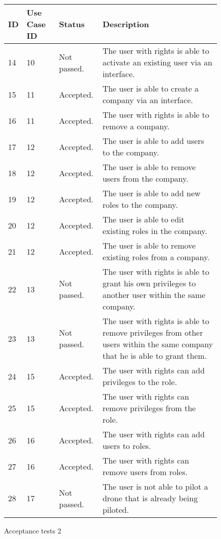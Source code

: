\begin{figure}[htb]
\begin{center}
\begin{tabular}{ | l | l | l | p{8cm} | }
  \hline
	\textbf{ID} & \textbf{Use Case ID} & \textbf{Status} & \textbf{Description} \\ \hline
	14 & 10 & Not passed. & The user with rights is able to activate an existing user via an interface.  \\ \hline
	15 & 11 & Accepted. & The user is able to create a company via an interface.  \\ \hline
	16 & 11 & Accepted. & The user with rights is able to remove a company. \\ \hline
	17 & 12 & Accepted. & The user is able to add users to the company.   \\ \hline
	18 & 12 & Accepted. & The user is able to remove users from the company.  \\ \hline
	19 & 12 & Accepted. & The user is able to add new roles to the company.  \\ \hline
	20 & 12 & Accepted. & The user is able to edit existing roles in the company.  \\ \hline
	21 & 12 & Accepted. & The user is able to remove existing roles from a company.  \\ \hline
	22 & 13 & Not passed. & The user with rights is able to grant his own privileges to another user within the same company.  \\ \hline
	23 & 13 & Not passed. & The user with rights is able to remove privileges from other users within the same company that he is able to grant them.  \\ \hline
	24 & 15 & Accepted. & The user with rights can add privileges to the role.  \\ \hline
	25 & 15 & Accepted. & The user with rights can remove privileges from the role.  \\ \hline
	26 & 16 & Accepted. & The user with rights can add users to roles.  \\ \hline
	27 & 16 & Accepted. & The user with rights can remove users from roles.  \\ \hline
	28 & 17 & Not passed. & The user is not able to pilot a drone that is already being piloted. \\
  \hline
\end{tabular}
\caption{Acceptance tests 2}
\label{tab:acceptance_tests2}
\end{center}
\end{figure}


